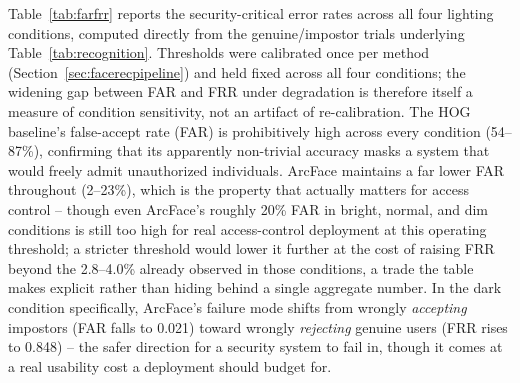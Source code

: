 \documentclass[conference]{IEEEtran}
\begin{document}
Table~\ref{tab:farfrr} reports the security-critical error rates
across all four lighting conditions, computed directly from the
genuine/impostor trials underlying Table~\ref{tab:recognition}.
Thresholds were calibrated once per method
(Section~\ref{sec:facerecpipeline}) and held fixed across all
four conditions; the widening gap between FAR and FRR under
degradation is therefore itself a measure of condition
sensitivity, not an artifact of re-calibration. The HOG baseline's
false-accept rate (FAR) is prohibitively high across every
condition (54--87\%), confirming that its apparently non-trivial
accuracy masks a system that would freely admit unauthorized
individuals. ArcFace maintains a far lower FAR throughout
(2--23\%), which is the property that actually matters for access
control -- though even ArcFace's roughly 20\% FAR in bright,
normal, and dim conditions is still too high for real
access-control deployment at this operating threshold; a stricter
threshold would lower it further at the cost of raising FRR
beyond the 2.8--4.0\% already observed in those conditions, a
trade the table makes explicit rather than hiding behind a single
aggregate number. In the dark condition specifically, ArcFace's
failure mode shifts from wrongly \textit{accepting} impostors
(FAR falls to 0.021) toward wrongly \textit{rejecting} genuine
users (FRR rises to 0.848) -- the safer direction for a security
system to fail in, though it comes at a real usability cost a
deployment should budget for.

\begin{table}[!t]
\caption{False-Accept and False-Reject Rates by Lighting Condition (fractions, range 0--1)}
\label{tab:farfrr}
\centering
{}
\end{table}
\end{document}
